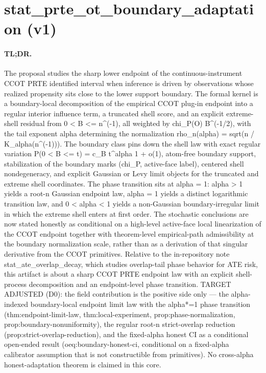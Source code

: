 \documentclass{article}
\begin{document}
\section*{stat_prte_ot_boundary_adaptation (v1)}

\paragraph{TL;DR.} The proposal studies the sharp lower endpoint of the continuous-instrument CCOT PRTE identified interval when inference is driven by observations whose realized propensity sits close to the lower support boundary. The formal kernel is a boundary-local decomposition of the empirical CCOT plug-in endpoint into a regular interior influence term, a truncated shell score, and an explicit extreme-shell residual from 0 < B <= n^(-1), all weighted by chi_P(O) B^(-1/2), with the tail exponent alpha determining the normalization rho_n(alpha) = sqrt(n / K_alpha(n^(-1))). The boundary class pins down the shell law with exact regular variation P(0 < B <= t) = c_B t^alpha {1 + o(1)}, atom-free boundary support, stabilization of the boundary marks (chi_P, active-face label), centered shell nondegeneracy, and explicit Gaussian or Levy limit objects for the truncated and extreme shell coordinates. The phase transition sits at alpha = 1: alpha > 1 yields a root-n Gaussian endpoint law, alpha = 1 yields a distinct logarithmic transition law, and 0 < alpha < 1 yields a non-Gaussian boundary-irregular limit in which the extreme shell enters at first order. The stochastic conclusions are now stated honestly as conditional on a high-level active-face local linearization of the CCOT endpoint together with theorem-level empirical-path admissibility at the boundary normalization scale, rather than as a derivation of that singular derivative from the CCOT primitives. Relative to the in-repository note stat_ate_overlap_decay, which studies overlap-tail phase behavior for ATE risk, this artifact is about a sharp CCOT PRTE endpoint law with an explicit shell-process decomposition and an endpoint-level phase transition. TARGET ADJUSTED (D0): the field contribution is the positive side only — the alpha-indexed boundary-local endpoint limit law with the alpha*=1 phase transition (thm:endpoint-limit-law, thm:local-experiment, prop:phase-normalization, prop:boundary-nonuniformity), the regular root-n strict-overlap reduction (prop:strict-overlap-reduction), and the fixed-alpha honest CI as a conditional open-ended result (oeq:boundary-honest-ci, conditional on a fixed-alpha calibrator assumption that is not constructible from primitives). No cross-alpha honest-adaptation theorem is claimed in this core.
\end{document}
